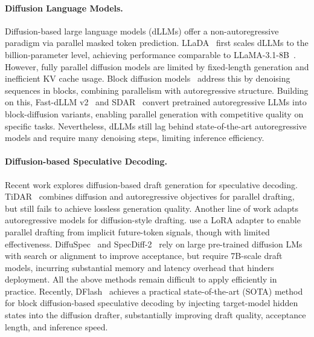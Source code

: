 \documentclass{llmxive}
\begin{document}
\paragraph{Diffusion Language Models.}
Diffusion-based large language models (dLLMs) offer a non-autoregressive paradigm via parallel masked token prediction. LLaDA~\cite{nie2025largelanguagediffusionmodels} first scales dLLMs to the billion-parameter level, achieving performance comparable to LLaMA-3.1-8B~\cite{grattafiori2024llama}. However, fully parallel diffusion models are limited by fixed-length generation and inefficient KV cache usage. Block diffusion models~\cite{arriola2025blockdiffusioninterpolatingautoregressive} address this by denoising sequences in blocks, combining parallelism with autoregressive structure. Building on this, Fast-dLLM v2~\cite{wu2025fastdllmv2efficientblockdiffusion} and SDAR~\cite{cheng2025sdarsynergisticdiffusionautoregressionparadigm} convert pretrained autoregressive LLMs into block-diffusion variants, enabling parallel generation with competitive quality on specific tasks. Nevertheless, dLLMs still lag behind state-of-the-art autoregressive models and require many denoising steps, limiting inference efficiency.

\paragraph{Diffusion-based Speculative Decoding.}
Recent work explores diffusion-based draft generation for speculative decoding. TiDAR~\cite{liu2025tidarthinkdiffusiontalk} combines diffusion and autoregressive objectives for parallel drafting, but still fails to achieve lossless generation quality. Another line of work adapts autoregressive models for diffusion-style drafting. \cite{samragh2025llmknowsfutureuncovering} use a LoRA adapter to enable parallel drafting from implicit future-token signals, though with limited effectiveness. DiffuSpec~\cite{li2025diffuspecunlockingdiffusionlanguage} and SpecDiff-2~\cite{sandler2025specdiff2scalingdiffusiondrafter} rely on large pre-trained diffusion LMs with search or alignment to improve acceptance, but require 7B-scale draft models, incurring substantial memory and latency overhead that hinders deployment. All the above methods remain difficult to apply efficiently in practice. Recently, DFlash~\cite{chen2026dflash} achieves a practical state-of-the-art (SOTA) method for block diffusion-based speculative decoding by injecting target-model hidden states into the diffusion drafter, substantially improving draft quality, acceptance length, and inference speed.
\end{document}
